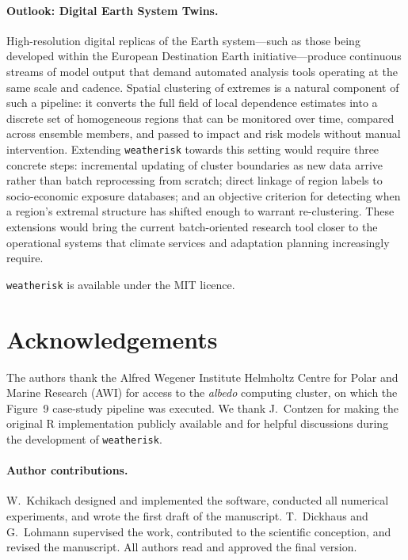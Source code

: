 \documentclass[preprint,12pt,a4paper]{elsarticle}
\newcommand{\revg}[1]{{\color{RevisionGreen}#1}}
\begin{document}
\revg{\paragraph{Outlook: Digital Earth System Twins.}
High-resolution digital replicas of the Earth system---such as those
being developed within the European Destination Earth
initiative---produce continuous streams of model output that demand
automated analysis tools operating at the same scale and cadence.
Spatial clustering of extremes is a natural component of such a
pipeline: it converts the full field of local dependence estimates
into a discrete set of homogeneous regions that can be monitored
over time, compared across ensemble members, and passed to impact
and risk models without manual intervention. Extending
\texttt{weatherisk} towards this setting would require three
concrete steps: incremental updating of cluster boundaries as new
data arrive rather than batch reprocessing from scratch; direct
linkage of region labels to socio-economic exposure databases; and
an objective criterion for detecting when a region's extremal
structure has shifted enough to warrant re-clustering.
These extensions would bring the current batch-oriented research
tool closer to the operational systems that climate services and
adaptation planning increasingly require.}

\revg{\texttt{weatherisk} is available under the MIT licence.}

\section*{Acknowledgements}

The authors thank the Alfred Wegener Institute Helmholtz Centre for
Polar and Marine Research (AWI) for access to the \emph{albedo}
computing cluster, on which the Figure~9 case-study pipeline was
executed. We thank J.~Contzen for making the original R
implementation publicly available and for helpful discussions during
the development of \texttt{weatherisk}.

\paragraph*{Author contributions.}
W.~Kchikach designed and implemented the software, conducted all
numerical experiments, and wrote the first draft of the manuscript.
T.~Dickhaus and G.~Lohmann supervised the work, contributed to the
scientific conception, and revised the manuscript. All authors read
and approved the final version.
\end{document}
